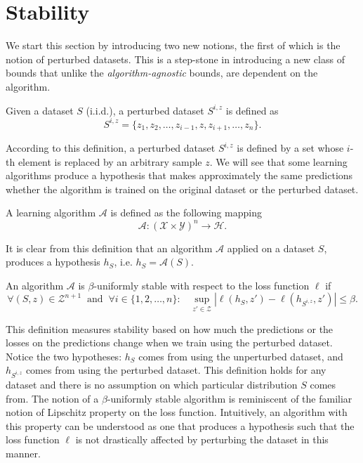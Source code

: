 \documentclass{article}
\begin{document}
\section{Stability}
We start this section by introducing two new notions, the first of which is the notion of  perturbed datasets. This is a step-stone in introducing a new class of bounds that unlike the   \textit{algorithm-agnostic} bounds, are dependent on the algorithm. 
\begin{defn} Given a dataset $S$ (i.i.d.), a perturbed dataset $S^{i, z}$ is defined as
\[
	S^{i,z} = \{z_1, z_2, \dots, z_{i-1}, z, z_{i+1}, \dots, z_{n} \}.
\]
\end{defn}
According to this definition, a perturbed dataset $S^{i,z}$ is defined by a set whose $i$-th element is replaced by an arbitrary sample $z$. 
We will see that some learning algorithms produce a hypothesis that makes approximately the same predictions whether the algorithm is trained on the original dataset or the perturbed dataset.
\begin{defn}[Algorithm]
A learning algorithm $\mathcal{A}$ is defined as the following mapping
\[
\mathcal{A}: (\mathcal{X} \times \mathcal{Y})^n \rightarrow \mathcal{H}.
\]
\end{defn}
It is clear from this definition that an algorithm $\mathcal{A}$ applied on a dataset $S$, produces a hypothesis $h_{S}$, i.e. $h_S = \mathcal{A}(S)$.


\begin{defn} An algorithm $\mathcal{A}$ is $\beta$-uniformly stable with respect to the loss function $\ell$ if
\[\forall (S,z) \in \mathcal{Z}^{n+1}\;\; \text{and} \;\;\forall i \in \{1, 2, \dots, n\}:\;\;\;
	\sup_{z' \in \mathcal{Z}} | \ell(h_S,z') - \ell(h_{S^{i, z}},z' ) | \le \beta.
\]
\end{defn}
This definition measures stability based on how much the predictions or the losses on the predictions change when we train using the perturbed dataset. Notice the two hypotheses: $h_S$ comes from using the unperturbed dataset, and $h_{S^{i,z}}$ comes from using the perturbed dataset. This definition holds for any dataset and there is no assumption on which particular distribution $S$ comes from. The notion of a $\beta$-uniformly stable algorithm is reminiscent of the familiar notion of Lipschitz property on the loss function. Intuitively, an algorithm with this property can be understood as one that produces a hypothesis such that the loss function $\ell$ is not drastically affected by perturbing the dataset in this manner.\\ 
 
\end{document}
